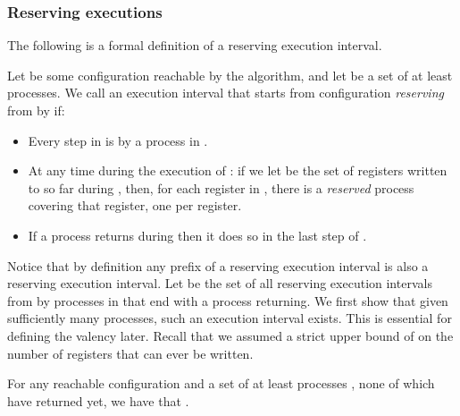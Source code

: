 \subsubsection{Reserving executions}
The following is a formal definition of a reserving execution interval.
\begin{definition}
Let  be some configuration reachable by the algorithm, 
  and let  be a set of at least  processes.
We call an execution interval  that starts from configuration  \emph{reserving} from  by  if:
\begin{itemize}[noitemsep, nolistsep]
\item Every step in  is by a process in .  
\item At any time during the execution of :  
  if we let  be the set of registers written to so far during , 
then, for each register in , there is a \emph{reserved} process  covering that register, one per register. 
\item If a process  returns during  then it does so in the last step of . 
\end{itemize}
\end{definition}
Notice that by definition any prefix of a reserving execution interval is also a reserving execution interval. 
Let  be the set of all reserving execution intervals from  by processes in 
  that end with a process  returning.
We first show that given sufficiently many processes, such an execution interval exists.
This is essential for defining the valency later.
Recall that we assumed a strict upper bound of  on the number of registers that can ever be written.
\begin{claim}
For any reachable configuration  and a set of at least  processes , none of which have returned yet, 
  we have that .
\label{clm:reserved}
\end{claim}
